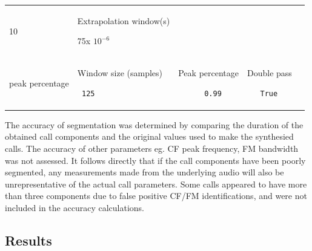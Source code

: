 \documentclass[
]{book}
\begin{document}
\begin{longtable}[]{@{}lllll@{}}
\begin{minipage}[t]{0.24\columnwidth}
10\strut
\end{minipage} & \begin{minipage}[t]{0.15\columnwidth}\raggedright
Extrapolation window(s)

75x \(10^{-6}\)\strut
\end{minipage}\tabularnewline
\begin{minipage}[t]{0.16\columnwidth}\raggedright
peak percentage\strut
\end{minipage} & \begin{minipage}[t]{0.14\columnwidth}\raggedright
Window size (samples)

\begin{verbatim}
 125
\end{verbatim}
\strut
\end{minipage} & \begin{minipage}[t]{0.17\columnwidth}\raggedright
Peak percentage

\begin{verbatim}
      0.99
\end{verbatim}
\strut
\end{minipage} & \begin{minipage}[t]{0.24\columnwidth}\raggedright
Double pass

\begin{verbatim}
   True
\end{verbatim}
\strut
\end{minipage} & \begin{minipage}[t]{0.15\columnwidth}\raggedright
\strut
\end{minipage}\tabularnewline
\bottomrule
\end{longtable}

The accuracy of segmentation was determined by comparing the duration of the obtained call components and the original values used to make the synthesied calls. The accuracy of other parameters eg. CF peak frequency, FM bandwidth was not assessed. It follows directly that if the call components have been poorly segmented, any measurements made from the underlying audio will also be unrepresentative of the actual call parameters. Some calls appeared to have more than three components due to false positive CF/FM identifications, and were not included in the accuracy calculations.

\hypertarget{results-2}{%
\subsection{Results}\label{results-2}}
\end{document}
